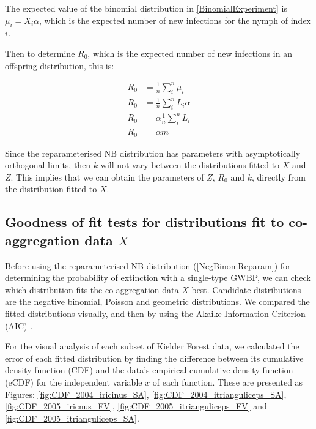 \documentclass[hidelinks]{article}
\begin{document}
The expected value of the binomial distribution in \eqref{BinomialExperiment} is $ \mu_i = X_i \alpha $, which is the expected number of new infections for the nymph of index $ i $.

Then to determine $ R_0 $, which is the expected number of new infections in an offspring distribution, this is:

\begin{align}
    R_0 &= \frac{1}{n} \sum_i^n \mu_i \nonumber \\
    R_0 &= \frac{1}{n} \sum_i^n L_i \alpha \nonumber \\
    R_0 &= \alpha \frac{1}{n} \sum_i^n L_i \nonumber \\
    R_0 &= \alpha m \label{FindingR0FromCoaggregationMean}
\end{align}

Since the reparameterised NB distribution has parameters with asymptotically orthogonal limits, then $ k $ will not vary between the distributions fitted to $ X $ and $ Z $. This implies that we can obtain the parameters of $ Z $, $ R_0 $ and $ k $, directly from the distribution fitted to $ X $.

\subsection{Goodness of fit tests for distributions fit to co-aggregation data \texorpdfstring{$ X $}{X}} 

Before using the reparameterised NB distribution (\ref{NegBinomReparam}) for determining the probability of extinction with a single-type GWBP, we can check which distribution fits the co-aggregation data $ X $ best. Candidate distributions are the negative binomial, Poisson and geometric distributions. We compared the fitted distributions visually, and then by using the Akaike Information Criterion (AIC) \citep{LloydSmith2005}.

For the visual analysis of each subset of Kielder Forest data, we calculated the error of each fitted distribution by finding the difference between its cumulative density function (CDF) and the data's empirical cumulative density function (eCDF) for the independent variable $ x $ of each function. These are presented as Figures: \ref{fig:CDF_2004_iricinus_SA}, \ref{fig:CDF_2004_itrianguliceps_SA}, \ref{fig:CDF_2005_iricnus_FV}, \ref{fig:CDF_2005_itrianguliceps_FV} and \ref{fig:CDF_2005_itrianguliceps_SA}.
\end{document}
